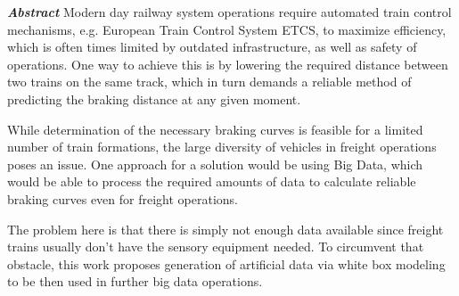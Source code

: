 \clearpage
\par\noindent
\textit{\textbf{Abstract}} Modern day railway system operations require automated train control mechanisms, e.g. European Train Control System ETCS, to maximize efficiency, which is often times limited by outdated infrastructure, as well as safety of operations. One way to achieve this is by lowering the required distance between two trains on the same track, which in turn demands a reliable method of predicting the braking distance at any given moment. 
\par
While determination of the necessary braking curves is feasible for a limited number of train formations, the large diversity of vehicles in freight operations poses an issue. One approach for a solution would be using Big Data, which would be able to process the required amounts of data to calculate reliable braking curves even for freight operations. 
\par
The problem here is that there is simply not enough data available since freight trains usually don't have the sensory equipment needed. To circumvent that obstacle, this work proposes generation of artificial data via white box modeling to be then used in further big data operations.